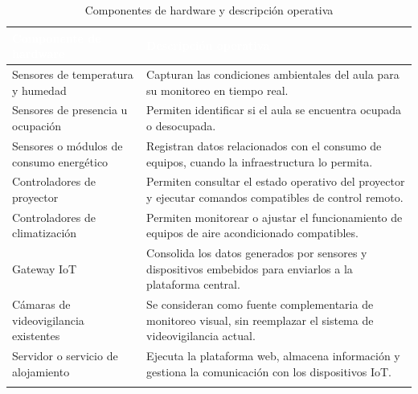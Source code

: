 \begingroup
\small
\begin{longtable}{|p{7.8cm}|p{7.8cm}|}
\hline
\cellcolor{sigagreen}\textcolor{white}{\textbf{Componente de hardware}} & \cellcolor{sigagreen}\textcolor{white}{\textbf{Descripción operativa}} \\ \hline
Sensores de temperatura y humedad & Capturan las condiciones ambientales del aula para su monitoreo en tiempo real. \\ \hline
Sensores de presencia u ocupación & Permiten identificar si el aula se encuentra ocupada o desocupada. \\ \hline
Sensores o módulos de consumo energético & Registran datos relacionados con el consumo de equipos, cuando la infraestructura lo permita. \\ \hline
Controladores de proyector & Permiten consultar el estado operativo del proyector y ejecutar comandos compatibles de control remoto. \\ \hline
Controladores de climatización & Permiten monitorear o ajustar el funcionamiento de equipos de aire acondicionado compatibles. \\ \hline
Gateway IoT & Consolida los datos generados por sensores y dispositivos embebidos para enviarlos a la plataforma central. \\ \hline
Cámaras de videovigilancia existentes & Se consideran como fuente complementaria de monitoreo visual, sin reemplazar el sistema de videovigilancia actual. \\ \hline
Servidor o servicio de alojamiento & Ejecuta la plataforma web, almacena información y gestiona la comunicación con los dispositivos IoT. \\ \hline
\caption{Componentes de hardware y descripción operativa}
\end{longtable}
\endgroup

